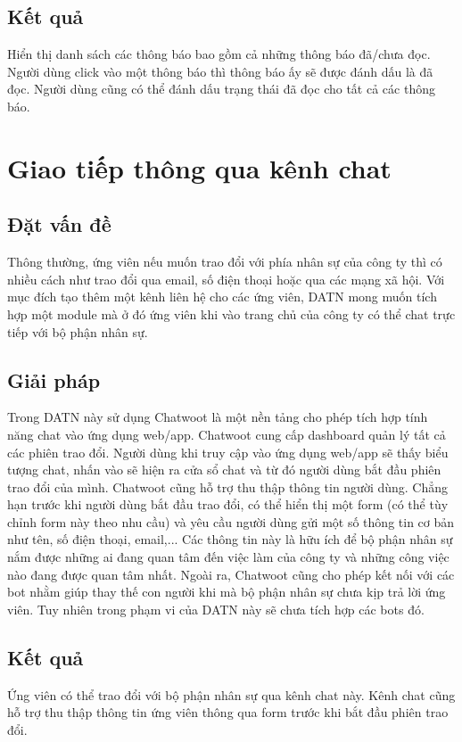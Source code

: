 \documentclass[../DoAn.tex]{subfiles}
\begin{document}
\subsection{Kết quả}
Hiển thị danh sách các thông báo bao gồm cả những thông báo đã/chưa đọc. Người dùng click vào một thông báo thì thông báo ấy sẽ được đánh dấu là đã đọc. Người dùng cũng có thể đánh dấu trạng thái đã đọc cho tất cả các thông báo.


\section{Giao tiếp thông qua kênh chat}
\subsection{Đặt vấn đề}
Thông thường, ứng viên nếu muốn trao đổi với phía nhân sự của công ty thì có nhiều cách như trao đổi qua email, số điện thoại hoặc qua các mạng xã hội. Với mục đích tạo thêm một kênh liên hệ cho các ứng viên, DATN mong muốn tích hợp một module mà ở đó ứng viên khi vào trang chủ của công ty có thể chat trực tiếp với bộ phận
nhân sự.

\subsection{Giải pháp}
Trong DATN này sử dụng Chatwoot\cite{Chatwoot} là một nền tảng cho phép tích hợp tính năng chat vào ứng dụng web/app. Chatwoot cung cấp dashboard quản lý tất cả các phiên trao đổi. Người dùng khi truy cập vào ứng dụng web/app sẽ thấy biểu tượng chat, nhấn vào sẽ hiện ra cửa sổ chat và từ đó người dùng bắt đầu phiên trao đổi của mình. Chatwoot cũng hỗ trợ thu thập thông tin người dùng. Chẳng hạn trước khi người dùng bắt đầu trao đổi, có thể hiển thị một form (có thể tùy chỉnh form này theo nhu cầu) và yêu cầu người dùng gửi một số thông tin cơ bản như tên, số điện thoại, email,... Các thông tin này là hữu ích để bộ phận nhân sự nắm được những ai đang quan tâm đến việc làm của công ty và những công việc nào đang được quan tâm nhất. Ngoài ra, Chatwoot cũng cho phép kết nối với các bot nhằm giúp thay thế con người khi mà bộ phận nhân sự chưa kịp trả lời ứng viên. Tuy nhiên trong phạm vi của DATN này sẽ chưa tích hợp các bots đó.

\subsection{Kết quả}
Ứng viên có thể trao đổi với bộ phận nhân sự qua kênh chat này. Kênh chat cũng hỗ trợ thu thập thông tin ứng viên thông qua form trước khi bắt đầu phiên trao đổi.
\end{document}
